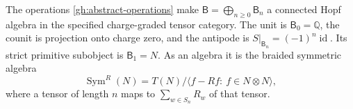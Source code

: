\begin{theorem}\label{gh:formal-hopf}
The operations \eqref{gh:abstract-operations} make
$\mathsf B=\bigoplus_{n\geq0}\mathsf B_n$ a connected Hopf
algebra in the specified charge-graded tensor category.
The unit is $\mathsf B_0=\mathbb Q$, the counit is projection onto
charge zero, and the antipode is
$S|_{\mathsf B_n}=(-1)^n\operatorname{id}$.
Its strict primitive subobject is $\mathsf B_1=N$.
As an algebra it is the braided symmetric algebra
\begin{equation}\label{gh:braided-symmetric}
 \operatorname{Sym}^R(N)=
 T(N)\big/\big\langle f-Rf:\ f\in N\otimes N\big\rangle ,
\end{equation}
where a tensor of length $n$ maps to
$\sum_{w\in S_n}R_w$ of that tensor.
\end{theorem}
